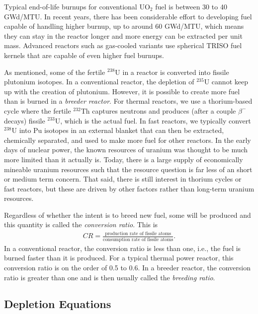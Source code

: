 Typical end-of-life burnups for conventional UO$_2$ fuel is between 30 to 40 GWd/MTU. In recent years, there has been considerable effort to developing fuel capable of handling higher burnup, up to around 60 GWd/MTU, which means they can stay in the reactor longer and more energy can be extracted per unit mass. Advanced reactors such as gas-cooled variants use spherical TRISO fuel kernels that are capable of even higher fuel burnups.

As mentioned, some of the fertile $^{238}$U in a reactor is converted into fissile plutonium isotopes. In a conventional reactor, the depletion of $^{235}$U cannot keep up with the creation of plutonium. However, it is possible to create more fuel than is burned in a \emph{breeder reactor}. For thermal reactors, we use a thorium-based cycle where the fertile $^{232}$Th captures neutrons and produces (after a couple $\beta^-$ decays) fissile $^{233}$U, which is the actual fuel. In fast reactors, we typically convert $^{238}$U into Pu isotopes in an external blanket that can then be extracted, chemically separated, and used to make more fuel for other reactors. In the early days of nuclear power, the known resources of uranium was thought to be much more limited than it actually is. Today, there is a large supply of economically mineable uranium resources such that the resource question is far less of an short or medium term concern. That said, there is still interest in thorium cycles or fast reactors, but these are driven by other factors rather than long-term uranium resources.

Regardless of whether the intent is to breed new fuel, some will be produced and this quantity is called the \emph{conversion ratio}. This is
\begin{align}
  CR = \frac{\text{production rate of fissile atoms}}{\text{consumption rate of fissile atoms}} .
\end{align}
In a conventional reactor, the conversion ratio is less than one, i.e., the fuel is burned faster than it is produced. For a typical thermal power reactor, this conversion ratio is on the order of 0.5 to 0.6. In a breeder reactor, the conversion ratio is greater than one and is then usually called the \emph{breeding ratio}.




\subsection{Depletion Equations} \label{Sec:kinetics_fuelDepletionEquations}

